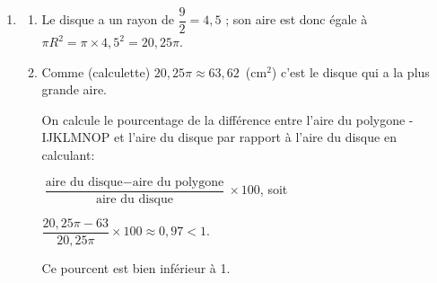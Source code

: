 \begin{enumerate}
\begin{enumerate}
	\end{enumerate}

\item %


	\begin{enumerate}
		\item %
Le disque a un rayon de $\dfrac92 = 4,5$ ; son aire est donc égale à $\pi R^2 = \pi \times 4,5^2 = 20,25\pi$.
		\item %
Comme (calculette) $20,25\pi \approx 63,62$~(cm$^2$) c'est le disque qui a la plus grande aire.

On calcule le pourcentage de la différence entre l'aire du polygone
-IJKLMNOP et l'aire du disque par rapport à l'aire du disque en calculant:

$\dfrac{\text{aire du disque} - \text{aire du polygone}}{\text{aire du disque}}\times 100$, soit 

$\dfrac{20,25\pi - 63}{20,25\pi} \times 100 \approx 0,97 < 1$.

Ce pourcent est bien inférieur à 1.
	\end{enumerate}
\end{enumerate}
